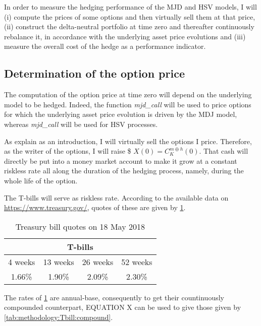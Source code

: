 \documentclass[a4paper, 12pt]{report}
\begin{document}
In order to measure the hedging performance of the MJD and HSV models, I will (i) compute the prices of some options and then virtually sell them at that price, (ii)  construct the delta-neutral portfolio at time zero and thereafter continuously rebalance it, in accordance with the underlying asset price evolutions and (iii) measure the overall cost of the hedge as a performance indicator.




\subsection{Determination of the option price}
\label{sec:methodology:determination}

The computation of the option price at time zero will depend on the underlying model to be hedged.
Indeed, the function \textit{mjd\_call} will be used to price options for which the underlying asset price evolution is driven by the MDJ model, whereas \textit{mjd\_call} will be used for HSV processes.

As explain as an introduction, I will virtually sell the options I price.
Therefore, as the writer of the options, I will raise \$ $X(0) = C_K^{m \oplus h} (0)$.
That cash will directly be put into a money market account to make it grow at a constant riskless rate all along the duration of the hedging process, namely, during the whole life of the option.

The T-bills will serve as riskless rate. According to the available data on \url{https://www.treasury.gov/}, quotes of these are given by \cref{tab:methodology:Tbill}.

\begin{table}[h]
\centering
\begin{tabular}{cccc}
  \hline
  \multicolumn{4}{c}{T-bills} \\
  \hline
  4 weeks & 13 weeks & 26 weeks & 52 weeks \\
  1.66\% & 1.90\% & 2.09\% & 2.30\% \\
  \hline
\end{tabular}
\caption{Treasury bill quotes on 18 May 2018} 
\label{tab:methodology:Tbill}
\end{table}

The rates of \cref{tab:methodology:Tbill} are annual-base, consequently to get their countinuously compounded counterpart, EQUATION X can be used to give those given by \cref{tab:methodology:Tbill:compound}.
\end{document}

